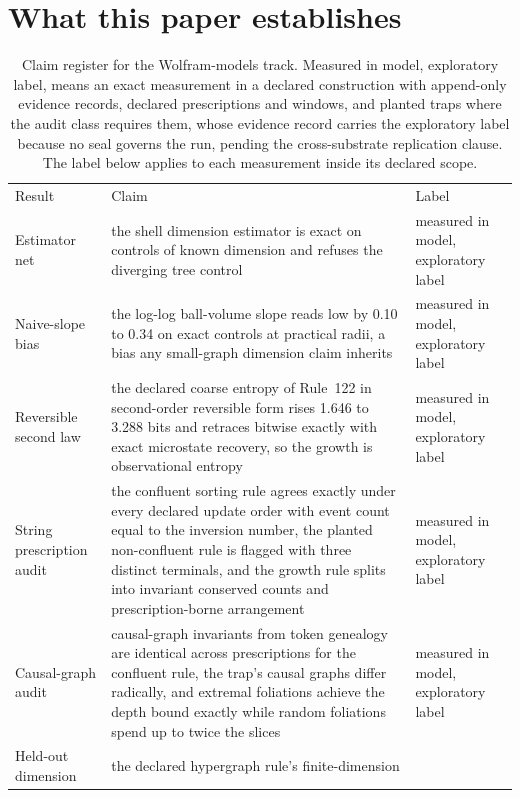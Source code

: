 \documentclass[aps,pre,reprint,nofootinbib]{revtex4-2}
\begin{document}
\section{What this paper establishes}
\label{sec:claims}

\begin{table}[t]
\caption{Claim register for the Wolfram-models track.  Measured in
model, exploratory label, means an exact measurement in a declared
construction with
append-only evidence records, declared prescriptions and windows, and
planted traps where the audit class requires them, whose evidence
record carries the exploratory label because no seal governs the run,
pending the cross-substrate replication clause.  The label below
applies to each measurement inside its declared scope.}
\label{tab:claims}
\begin{ruledtabular}
\begin{tabular}{L{4.6cm} L{9.2cm} l}
Result & Claim & Label \\
\colrule
Estimator net & the shell dimension estimator is exact on controls of
known dimension and refuses the diverging tree control &
measured in model, exploratory label \\
Naive-slope bias & the log-log ball-volume slope reads low by 0.10 to
0.34 on exact controls at practical radii, a bias any small-graph
dimension claim inherits & measured in model, exploratory label \\
Reversible second law & the declared coarse entropy of Rule~122 in
second-order reversible form rises 1.646 to 3.288 bits and retraces
bitwise exactly with exact microstate recovery, so the growth is
observational entropy & measured in model, exploratory label \\
String prescription audit & the confluent sorting rule agrees exactly
under every declared update order with event count equal to the
inversion number, the planted non-confluent rule is flagged with three
distinct terminals, and the growth rule splits into invariant
conserved counts and prescription-borne arrangement &
measured in model, exploratory label \\
Causal-graph audit & causal-graph invariants from token genealogy are
identical across prescriptions for the confluent rule, the trap's
causal graphs differ radically, and extremal foliations achieve the
depth bound exactly while random foliations spend up to twice the
slices & measured in model, exploratory label \\
Held-out dimension & the declared hypergraph rule's finite-dimension

\end{tabular}
\end{ruledtabular}
\end{table}
\end{document}
